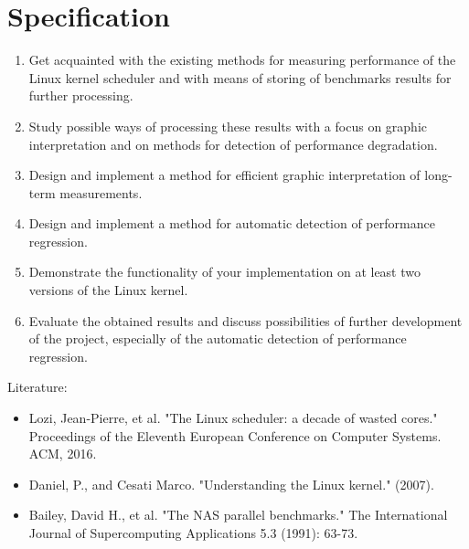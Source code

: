 \chapter{Specification}
\begin{enumerate}
\item Get acquainted with the existing methods for measuring performance of the Linux kernel scheduler and with means of storing of benchmarks results for further processing.
\item Study possible ways of processing these results with a focus on graphic interpretation and on methods for detection of performance degradation.
\item Design and implement a method for efficient graphic interpretation of long-term measurements.
\item Design and implement a method for automatic detection of performance regression.
\item Demonstrate the functionality of your implementation on at least two versions of the Linux kernel.
\item Evaluate the obtained results and discuss possibilities of further development of the project, especially of the automatic detection of performance regression.
\end{enumerate}

Literature:
\begin{itemize}
\item Lozi, Jean-Pierre, et al. "The Linux scheduler: a decade of wasted cores." Proceedings of the Eleventh European Conference on Computer Systems. ACM, 2016.
\item Daniel, P., and Cesati Marco. "Understanding the Linux kernel." (2007).
\item Bailey, David H., et al. "The NAS parallel benchmarks." The International Journal of Supercomputing Applications 5.3 (1991): 63-73.
\end{itemize}
